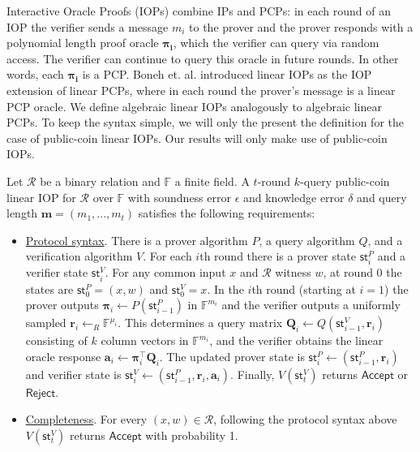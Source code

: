 Interactive Oracle Proofs (IOPs) \cite{BCS16, RRR16} combine IPs and PCPs: in each round of an IOP the verifier sends a message $m_i$ to the prover and the prover responds with a polynomial length proof oracle $\boldsymbol{\pi_i}$, which the verifier can query via random access. The verifier can continue to query this oracle in future rounds. In other words, each $\boldsymbol{\pi_i}$ is a PCP. Boneh et. al. \cite{IshaiCorrigan} introduced linear IOPs as the IOP extension of linear PCPs, where in each round the prover's message is a linear PCP oracle. We define algebraic linear IOPs analogously to algebraic linear PCPs. To keep the syntax simple, we will only the present the definition for the case of public-coin linear IOPs. Our results will only make use of public-coin IOPs. 

\begin{definition} 
\label{def:linearIOP}
Let $\mathcal{R}$ be a binary relation and $\mathbb{F}$ a finite field. A $t$-round $k$-query public-coin linear IOP for $\mathcal{R}$ over $\mathbb{F}$ with soundness error $\epsilon$ and knowledge error $\delta$ and query length $\mathbf{m} = (m_1,...,m_t)$ satisfies the following requirements: 

\begin{itemize} 
\item \underline{Protocol syntax}. There is a prover algorithm $P$, a query algorithm $Q$, and a verification algorithm $V$. For each $i$th round there is a prover state $\textsf{st}^P_i$ and a verifier state $\textsf{st}^V_i$. For any common input $x$ and $\mathcal{R}$ witness $w$, at round 0 the states are $\textsf{st}^P_0 = (x, w)$ and $\textsf{st}^V_0 = x$. 
In the $i$th round (starting at $i = 1$) the prover outputs $\boldsymbol{\pi}_i \leftarrow P(\textsf{st}^P_{i-1})$ in $\mathbb{F}^{m_i}$ and the verifier outputs a uniformly sampled $\mathbf{r}_i \leftarrow_R \mathbb{F}^{\mu_i}$. 
This determines a query matrix $\mathbf{Q}_i \leftarrow Q(\textsf{st}^V_{i-1}, \mathbf{r}_i)$ consisting of $k$ column vectors in $\mathbb{F}^{m_i}$, and the verifier obtains the linear oracle response $\mathbf{a}_i \leftarrow \boldsymbol{\pi}_i^\top \mathbf{Q}_i$. The updated prover state is $\textsf{st}^P_i \leftarrow (\textsf{st}^P_{i-1}, \mathbf{r}_i)$ and verifier state is $\textsf{st}^V_i \leftarrow (\textsf{st}^P_{i-1}, \mathbf{r}_i, \mathbf{a}_i)$. Finally, $V(\textsf{st}^V_t)$ returns $\textsf{Accept}$ or $\textsf{Reject}$.

\item \underline{Completeness}. For every $(x, w) \in \mathcal{R}$, following the protocol syntax above $V(\textsf{st}^V_t)$ returns $\textsf{Accept}$ with probability 1. 


\end{itemize}
\end{definition}

